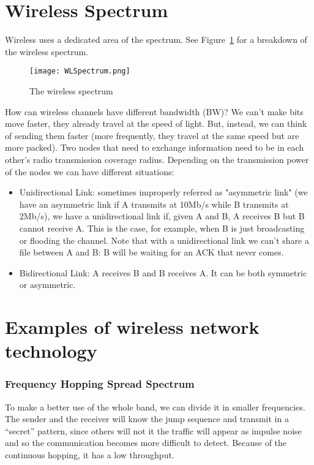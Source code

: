 \section{Wireless Spectrum}
Wireless uses a dedicated area of the spectrum. See
Figure~\ref{fig:ewn:WLSpectrum} for a breakdown of the wireless spectrum.

\begin{figure}[h]
  \centering
  \texttt{[image: WLSpectrum.png]}
  \caption{The wireless spectrum}				
  \label{fig:ewn:WLSpectrum}
\end{figure}	

How can wireless channels have different bandwidth (BW)? We can't make 
bits move faster, they already travel at the speed of light. But, instead, we 
can think of sending them faster (more frequently, they travel at the same 
speed but are more packed).
Two nodes that need to exchange information need to be in each other's 
radio transmission coverage radius. Depending on the transmission power of the 
nodes we can have different situations:
\begin{itemize}
\item Unidirectional Link: sometimes improperly referred as 
  "asymmetric link" (we have an asymmetric link if A transmits at 10Mb/s while B 
  transmits at 2Mb/s), we have a unidirectional link if, given A and B, A
  receives B but B cannot receive A. This is the case, for example, when B is
  just broadcasting or flooding the channel. Note that with a unidirectional
  link we can't share a file between A and B: B will be waiting for an ACK that
  never comes.
\item Bidirectional Link: A receives B and B receives A. It can be both
  symmetric or asymmetric.
\end{itemize}

\section{Examples of wireless network technology}

\subsubsection{Frequency Hopping Spread Spectrum}
To make a better use of the whole band, we can divide it in smaller frequencies.
The sender and the receiver will know the jump sequence and transmit in a
``secret'' pattern, since others will not it the traffic will appear as impulse
noise and so the communication becomes more difficult to detect. Because of the
continuous hopping, it has a low throughput.

